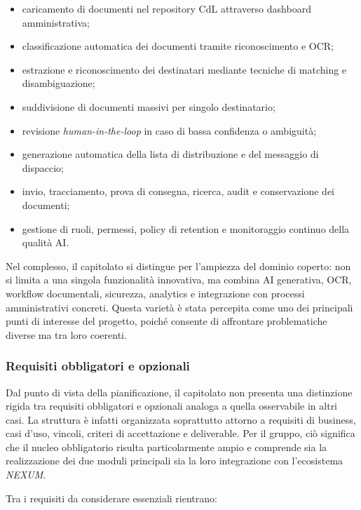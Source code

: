 \documentclass[a4paper,12pt]{article}
\begin{document}
\begin{itemize}
    \item caricamento di documenti nel repository CdL attraverso dashboard amministrativa;
    \item classificazione automatica dei documenti tramite riconoscimento e OCR;
    \item estrazione e riconoscimento dei destinatari mediante tecniche di matching e disambiguazione;
    \item suddivisione di documenti massivi per singolo destinatario;
    \item revisione \textit{human-in-the-loop} in caso di bassa confidenza o ambiguità;
    \item generazione automatica della lista di distribuzione e del messaggio di dispaccio;
    \item invio, tracciamento, prova di consegna, ricerca, audit e conservazione dei documenti;
    \item gestione di ruoli, permessi, policy di retention e monitoraggio continuo della qualità AI.
\end{itemize}

Nel complesso, il capitolato si distingue per l'ampiezza del dominio coperto: non si limita a una singola funzionalità innovativa, ma combina AI generativa, OCR, workflow documentali, sicurezza, analytics e integrazione con processi amministrativi concreti. Questa varietà è stata percepita come uno dei principali punti di interesse del progetto, poiché consente di affrontare problematiche diverse ma tra loro coerenti.

\subsubsection{Requisiti obbligatori e opzionali}

Dal punto di vista della pianificazione, il capitolato non presenta una distinzione rigida tra requisiti obbligatori e opzionali analoga a quella osservabile in altri casi. La struttura è infatti organizzata soprattutto attorno a requisiti di business, casi d'uso, vincoli, criteri di accettazione e deliverable. Per il gruppo, ciò significa che il nucleo obbligatorio risulta particolarmente ampio e comprende sia la realizzazione dei due moduli principali sia la loro integrazione con l'ecosistema \textit{NEXUM}.

Tra i requisiti da considerare essenziali rientrano:
\end{document}
